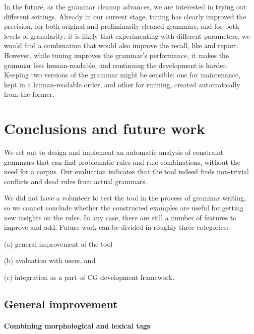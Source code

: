 {{In the future, as the grammar cleanup advances, we are interested in
trying out different settings.
Already in our current stage, tuning has clearly improved the
precision, for both original and preliminarily cleaned grammars, and
for both levels of granularity; it is likely that experimenting with
different parameters, we would find a combination that would also
improve the recall, like \citet{bick2013tuning} and
\citet{bick_hagen2015obt} report.  However, while tuning improves the
grammar's performance, it makes the grammar less human-readable, and
continuing the development is harder. Keeping two versions of the grammar
might be sensible: one for maintenance, kept in a human-readable order,
and other for running, created automatically from the former.



\section{Conclusions and future work}

We set out to design and implement an automatic analysis of constraint grammars
that can find problematic rules and rule combinations, without the need for a corpus.
Our evaluation indicates that the tool indeed finds non-trivial conflicts and dead rules
from actual grammars.

We did not have a volunteer to test the tool in
the process of grammar writing, so we cannot conclude whether the
constructed examples are useful for getting new insights on the rules.
In any case, there are still a number of features to improve and add.
Future work can be divided in roughly three categories:
\begin{inparaenum}
\item[(a)] general improvement of the tool
\item[(b)] evaluation with users, and
\item[(c)] integration as a part of CG development framework.
\end{inparaenum}

\subsection{General improvement}

\paragraph{Combining morphological and lexical tags}

}}
